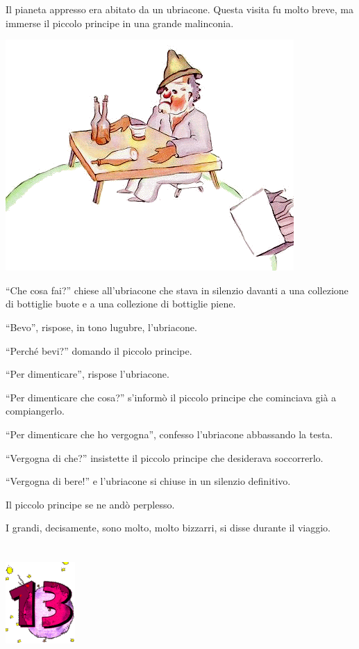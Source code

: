 \documentclass[11pt]{scrbook}
\begin{document}
Il pianeta appresso era abitato da un ubriacone. Questa visita fu molto
breve, ma immerse il piccolo principe in una grande malinconia.

\begin{center}
\includegraphics{img/12a}
\end{center}

``Che cosa fai?'' chiese all'ubriacone che stava in silenzio davanti a
una collezione di bottiglie buote e a una collezione di bottiglie piene.

``Bevo'', rispose, in tono lugubre, l'ubriacone.

``Perché bevi?'' domando il piccolo principe.

``Per dimenticare'', rispose l'ubriacone.

``Per dimenticare che cosa?'' s'informò il piccolo principe che
cominciava già a compiangerlo.

``Per dimenticare che ho vergogna'', confesso l'ubriacone abbassando la
testa.

``Vergogna di che?'' insistette il piccolo principe che desiderava
soccorrerlo.

``Vergogna di bere!'' e l'ubriacone si chiuse in un silenzio definitivo.

Il piccolo principe se ne andò perplesso.

I grandi, decisamente, sono molto, molto bizzarri, si disse durante il
viaggio.

\chapter{}
\begin{center}
\includegraphics{img/chapter13}
\end{center}
\end{document}
